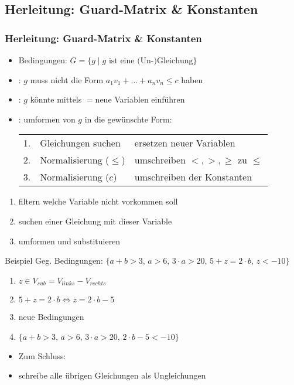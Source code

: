 \subsection{Herleitung: Guard-Matrix \& Konstanten}
\begin{frame}
	\frametitle{Herleitung: Guard-Matrix \& Konstanten}
	\begin{itemize}
		\item Bedingungen: $G=\{g \mid g \text{ ist eine (Un-)Gleichung}\}$
		\item<2-> : $g$ muss nicht die Form $a_1 v_1+\dots +a_n v_n \le c$ haben
		\item<3-> : $g$ k\"onnte mittels \glqq$=$\grqq neue Variablen einf\"uhren
		\item<4-> : umformen von $g$ in die gew\"unschte Form: 
			\begin{tabular}{cll}
				1. & Gleichungen suchen   & ersetzen \glqq neuer \grqq Variablen \\
				2. & Normalisierung ($\le$) & umschreiben $<,>,\ge$ zu $\le$ \\
				3. & Normalisierung ($c$)   & umschreiben der Konstanten\\
			\end{tabular}
	\end{itemize}	
\end{frame}

\begin{frame}[fragile]
	\begin{enumerate}
		\item filtern welche Variable nicht vorkommen soll
		\item suchen einer Gleichung mit dieser Variable
		\item umformen und substituieren
	\end{enumerate}
	\begin{exampleblock}{Beispiel}
		Geg. Bedingungen:
		$\{a + b > 3\text{, } a > 6 \text{, } 3 \cdot  a > 20 \text{, } 5 + z = 2 \cdot  b \text{, } z < -10\}$
		\begin{enumerate}
			\item $z \in V_{sub}=V_{links}-V_{rechts}$
			\item $5+z=2\cdot b \Leftrightarrow z=2\cdot b - 5$
			\item neue Bedingungen
			\item[] $\{a + b > 3\text{, } a > 6 \text{, } 3 \cdot  a > 20 \text{, } 2\cdot b-5 < -10\}$
		\end{enumerate}
	\end{exampleblock}
	\begin{itemize}
		\item[] Zum Schluss: 
		\item[] schreibe alle \"ubrigen Gleichungen als Ungleichungen
	\end{itemize}
\end{frame}

